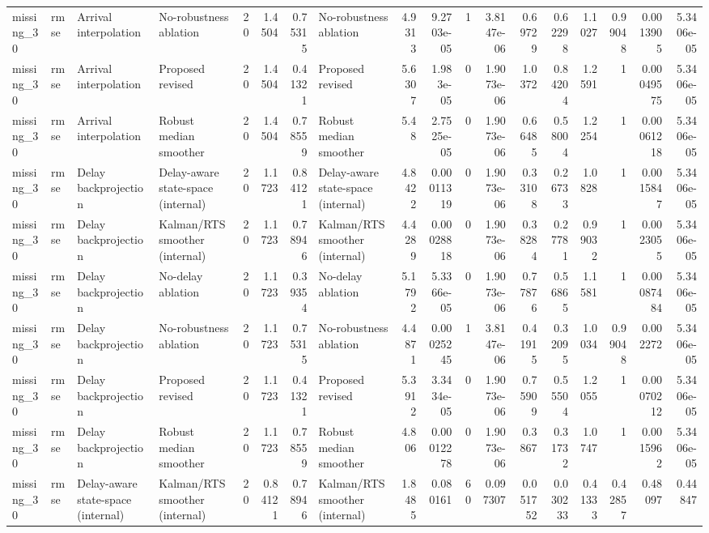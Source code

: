 \begin{table}[!htbp]
{\begin{tabular}{llllrrrlrrrrrrrrrr}
missing_30 & rmse & Arrival interpolation & No-robustness ablation & 20 & 1.4504 & 0.75315 & No-robustness ablation & 4.9313 & 9.2703e-05 & 1 & 3.8147e-06 & 0.69729 & 0.62298 & 1.1027 & 0.99048 & 0.0013905 & 5.3406e-05 \\
missing_30 & rmse & Arrival interpolation & Proposed revised & 20 & 1.4504 & 0.41321 & Proposed revised & 5.6307 & 1.983e-05 & 0 & 1.9073e-06 & 1.0372 & 0.84204 & 1.2591 & 1 & 0.00049575 & 5.3406e-05 \\
missing_30 & rmse & Arrival interpolation & Robust median smoother & 20 & 1.4504 & 0.78559 & Robust median smoother & 5.48 & 2.7525e-05 & 0 & 1.9073e-06 & 0.66485 & 0.58004 & 1.2254 & 1 & 0.00061218 & 5.3406e-05 \\
missing_30 & rmse & Delay backprojection & Delay-aware state-space (internal) & 20 & 1.1723 & 0.84121 & Delay-aware state-space (internal) & 4.8422 & 0.00011319 & 0 & 1.9073e-06 & 0.33108 & 0.26733 & 1.0828 & 1 & 0.0015847 & 5.3406e-05 \\
missing_30 & rmse & Delay backprojection & Kalman/RTS smoother (internal) & 20 & 1.1723 & 0.78946 & Kalman/RTS smoother (internal) & 4.4289 & 0.00028818 & 0 & 1.9073e-06 & 0.38284 & 0.27781 & 0.99032 & 1 & 0.0023055 & 5.3406e-05 \\
missing_30 & rmse & Delay backprojection & No-delay ablation & 20 & 1.1723 & 0.39354 & No-delay ablation & 5.1792 & 5.3366e-05 & 0 & 1.9073e-06 & 0.77876 & 0.56865 & 1.1581 & 1 & 0.00087484 & 5.3406e-05 \\
missing_30 & rmse & Delay backprojection & No-robustness ablation & 20 & 1.1723 & 0.75315 & No-robustness ablation & 4.4871 & 0.00025245 & 1 & 3.8147e-06 & 0.41915 & 0.32095 & 1.0034 & 0.99048 & 0.002272 & 5.3406e-05 \\
missing_30 & rmse & Delay backprojection & Proposed revised & 20 & 1.1723 & 0.41321 & Proposed revised & 5.3912 & 3.3434e-05 & 0 & 1.9073e-06 & 0.75909 & 0.55504 & 1.2055 & 1 & 0.00070212 & 5.3406e-05 \\
missing_30 & rmse & Delay backprojection & Robust median smoother & 20 & 1.1723 & 0.78559 & Robust median smoother & 4.806 & 0.00012278 & 0 & 1.9073e-06 & 0.3867 & 0.31732 & 1.0747 & 1 & 0.0015962 & 5.3406e-05 \\
missing_30 & rmse & Delay-aware state-space (internal) & Kalman/RTS smoother (internal) & 20 & 0.84121 & 0.78946 & Kalman/RTS smoother (internal) & 1.8485 & 0.080161 & 60 & 0.097307 & 0.051752 & 0.030233 & 0.41333 & 0.42857 & 0.48097 & 0.44847 \\

\end{tabular}}
\end{table}

